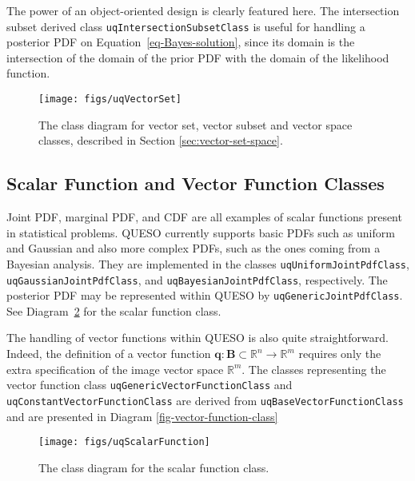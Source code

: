 The power of an object-oriented design is clearly featured here.
The intersection subset derived class \verb+uqIntersectionSubsetClass+ is useful for handling a posterior PDF  on Equation~\eqref{eq-Bayes-solution},
since its domain is the intersection of the domain of the prior PDF with the domain of the likelihood function.

\begin{figure}[htpb]
\centering
\texttt{[image: figs/uqVectorSet]}
\vspace*{-8pt}
\caption{The class diagram for vector set, vector subset and vector space classes, described in Section \ref{sec:vector-set-space}.}
\label{fig-vector-space-subset-classes}
\end{figure}

\subsection{Scalar Function and Vector Function Classes}\label{sec:scalar-vector-function}

Joint PDF, marginal PDF, and CDF are all examples of scalar functions present in statistical problems. 
QUESO currently supports basic PDFs such as uniform and Gaussian and also more complex PDFs, such as the ones coming from a Bayesian analysis. They are implemented in the classes \verb+uqUniformJointPdfClass+, \verb+uqGaussianJointPdfClass+, and \verb+uqBayesianJointPdfClass+, respectively. The posterior PDF may be represented within QUESO by \verb+uqGenericJointPdfClass+.
See Diagram~\ref{fig-scalar-function-class} for the scalar function class.

The handling of vector functions within QUESO is also quite straightforward. Indeed, the definition of a vector function $\mathbf{q}:\mathbf{B}\subset\mathbb{R}^n\rightarrow\mathbb{R}^m$ requires only the extra specification of the image vector space $\mathbb{R}^m$. The classes representing the vector function class \verb+uqGenericVectorFunctionClass+ and \verb+uqConstantVectorFunctionClass+ are derived  from \verb+uqBaseVectorFunctionClass+ and are presented in Diagram \ref{fig-vector-function-class} 
\begin{figure}[htpb]
\centering
\texttt{[image: figs/uqScalarFunction]}
\vspace{-6pt}
\caption{The class diagram for the scalar function class.}
\label{fig-scalar-function-class}
\end{figure}

